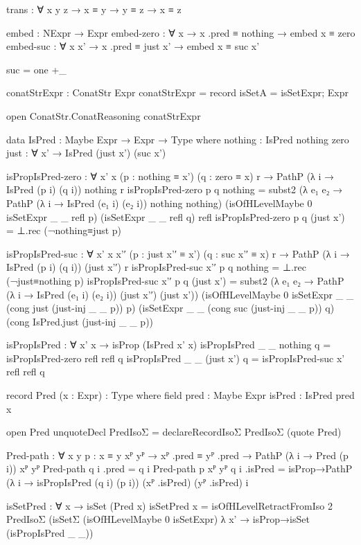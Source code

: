 \begin{code}[hide]
    trans : ∀ {x y z} → x ≡ y → y ≡ z → x ≡ z

    embed : NExpr → Expr
    embed-zero : ∀ x → x .pred ≡ nothing → embed x ≡ zero
    embed-suc : ∀ x x' → x .pred ≡ just x' → embed x ≡ suc x'

  suc = one +_

  conatStrExpr : ConatStr Expr
  conatStrExpr = record{ isSetA = isSetExpr; Expr }

  open ConatStr.ConatReasoning conatStrExpr

  data IsPred : Maybe Expr → Expr → Type where
    nothing : IsPred nothing zero
    just : ∀ x' → IsPred (just x') (suc x')

  isPropIsPred-zero :
    ∀ {x' x} (p : nothing ≡ x') (q : zero ≡ x) r →
    PathP (λ i → IsPred (p i) (q i)) nothing r
  isPropIsPred-zero p q nothing =
    subst2 (λ e₁ e₂ → PathP (λ i → IsPred (e₁ i) (e₂ i)) nothing nothing)
      (isOfHLevelMaybe 0 isSetExpr _ _ refl p)
      (isSetExpr _ _ refl q)
      refl
  isPropIsPred-zero p q (just x') = ⊥.rec (¬nothing≡just p)

  isPropIsPred-suc :
    ∀ {x' x} x'′ (p : just x'′ ≡ x') (q : suc x'′ ≡ x) r →
    PathP (λ i → IsPred (p i) (q i)) (just x'′) r
  isPropIsPred-suc x'′ p q nothing = ⊥.rec (¬just≡nothing p)
  isPropIsPred-suc x'′ p q (just x') =
    subst2 (λ e₁ e₂ → PathP (λ i → IsPred (e₁ i) (e₂ i)) (just x'′) (just x'))
      (isOfHLevelMaybe 0 isSetExpr _ _ (cong just (just-inj _ _ p)) p)
      (isSetExpr _ _ (cong suc (just-inj _ _ p)) q)
      (cong IsPred.just (just-inj _ _ p))

  isPropIsPred : ∀ x' x → isProp (IsPred x' x)
  isPropIsPred _ _ nothing q = isPropIsPred-zero refl refl q
  isPropIsPred _ _ (just x') q = isPropIsPred-suc x' refl refl q

  record Pred (x : Expr) : Type where
    field
      pred : Maybe Expr
      isPred : IsPred pred x

  open Pred
  unquoteDecl PredIsoΣ = declareRecordIsoΣ PredIsoΣ (quote Pred)

  Pred-path :
    ∀ {x y} {p : x ≡ y} {xᴾ yᴾ} →
    xᴾ .pred ≡ yᴾ .pred → PathP (λ i → Pred (p i)) xᴾ yᴾ
  Pred-path q i .pred = q i
  Pred-path {p} {xᴾ} {yᴾ} q i .isPred =
    isProp→PathP (λ i → isPropIsPred (q i) (p i)) (xᴾ .isPred) (yᴾ .isPred) i

  isSetPred : ∀ x → isSet (Pred x)
  isSetPred x =
    isOfHLevelRetractFromIso 2 PredIsoΣ
      (isSetΣ (isOfHLevelMaybe 0 isSetExpr) λ x' →
        isProp→isSet (isPropIsPred _ _))


\end{code}
